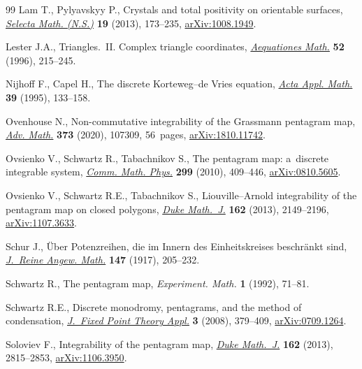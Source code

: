 \documentclass[pdftex]{sigma}
\numberwithin{equation}{section}
\begin{document}
\begin{thebibliography}{99}
Lam T., Pylyavskyy P., Crystals and total positivity on orientable surfaces,
 \href{https://doi.org/10.1007/s00029-012-0094-2}{\textit{Selecta Math.
 (N.S.)}} \textbf{19} (2013), 173--235,
 \href{http://arxiv.org/abs/1008.1949}{arXiv:1008.1949}.

Lester J.A., Triangles.~{II}. {C}omplex triangle coordinates,
 \href{https://doi.org/10.1007/BF01818341}{\textit{Aequationes Math.}}
 \textbf{52} (1996), 215--245.

Nijhoff F., Capel H., The discrete {K}orteweg--de {V}ries equation,
 \href{https://doi.org/10.1007/BF00994631}{\textit{Acta Appl. Math.}}
 \textbf{39} (1995), 133--158.

Ovenhouse N., Non-commutative integrability of the {G}rassmann pentagram map,
 \href{https://doi.org/10.1016/j.aim.2020.107309}{\textit{Adv. Math.}}
 \textbf{373} (2020), 107309, 56~pages,
 \href{http://arxiv.org/abs/1810.11742}{arXiv:1810.11742}.

Ovsienko V., Schwartz R., Tabachnikov S., The pentagram map: a~discrete
 integrable system,
 \href{https://doi.org/10.1007/s00220-010-1075-y}{\textit{Comm. Math. Phys.}}
 \textbf{299} (2010), 409--446,
 \href{http://arxiv.org/abs/0810.5605}{arXiv:0810.5605}.

Ovsienko V., Schwartz R.E., Tabachnikov S., Liouville--{A}rnold integrability
 of the pentagram map on closed polygons,
 \href{https://doi.org/10.1215/00127094-2348219}{\textit{Duke Math.~J.}}
 \textbf{162} (2013), 2149--2196,
 \href{http://arxiv.org/abs/1107.3633}{arXiv:1107.3633}.

Schur J., \"Uber {P}otenzreihen, die im {I}nnern des {E}inheitskreises
 beschr\"ankt sind,
 \href{https://doi.org/10.1515/crll.1917.147.205}{\textit{J.~Reine Angew.
 Math.}} \textbf{147} (1917), 205--232.

Schwartz R., The pentagram map, \textit{Experiment. Math.} \textbf{1} (1992),
 71--81.

Schwartz R.E., Discrete monodromy, pentagrams, and the method of condensation,
 \href{https://doi.org/10.1007/s11784-008-0079-0}{\textit{J.~Fixed Point
 Theory Appl.}} \textbf{3} (2008), 379--409,
 \href{http://arxiv.org/abs/0709.1264}{arXiv:0709.1264}.

Soloviev F., Integrability of the pentagram map,
 \href{https://doi.org/10.1215/00127094-2382228}{\textit{Duke Math.~J.}}
 \textbf{162} (2013), 2815--2853,
 \href{http://arxiv.org/abs/1106.3950}{arXiv:1106.3950}.


\end{thebibliography}
\end{document}
